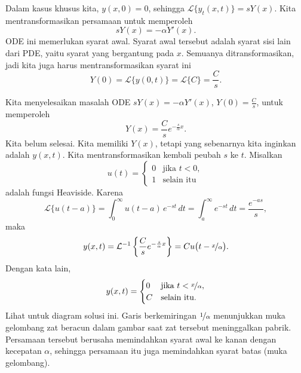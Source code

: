 \begin{example}
Dalam kasus khusus kita,
$y(x,0)=0$, sehingga
${\mathcal L} \bigl\{ y_t(x,t) \bigr\} = sY(x)$.  Kita mentransformasikan persamaan
untuk memperoleh
\begin{equation*}
sY(x) = -\alpha Y'(x) .
\end{equation*}
ODE ini memerlukan syarat awal.  Syarat awal tersebut adalah
syarat sisi lain dari PDE\@, yaitu syarat yang bergantung pada $x$.  Semuanya
ditransformasikan, jadi kita juga harus mentransformasikan syarat ini
\begin{equation*}
Y(0) = 
{\mathcal L} \bigl\{ y(0,t) \bigr\} 
=
{\mathcal L} \bigl\{ C \bigr\} 
=
\frac{C}{s} .
\end{equation*}

Kita menyelesaikan masalah ODE $sY(x) = -\alpha Y'(x)$, $Y(0) = \frac{C}{s}$, untuk memperoleh
\begin{equation*}
Y(x) = \frac{C}{s} e^{-\frac{s}{\alpha} x} .
\end{equation*}
Kita belum selesai.
Kita memiliki $Y(x)$, tetapi yang sebenarnya kita inginkan adalah $y(x,t)$.
Kita mentransformasikan kembali peubah $s$ ke $t$.
Misalkan 
\begin{equation*}
u(t) = \begin{cases} 0 & \text{jika $t < 0$}, \\ 1 & \text{selain itu}
\end{cases}
\end{equation*}
adalah fungsi Heaviside.
Karena
\begin{equation*}
{\mathcal L} \bigl\{ u(t-a) \bigr\} =
\int_0^\infty u(t-a) \, e^{-st} \,dt
=
\int_a^\infty e^{-st} \,dt
=
\frac{e^{-as}}{s} ,
\end{equation*}
maka
\begin{equation*}
y(x,t) = {\mathcal L}^{-1} \left\{
\frac{C}{s} e^{-\frac{s}{\alpha} x}
\right\}
=
C u\bigl(t-\nicefrac{x}{\alpha}\bigr) .
\end{equation*}
Dengan kata lain,
\begin{equation*}
y(x,t) =
\begin{cases}
0 & \text{jika $t < \nicefrac{x}{\alpha}$}, \\
C & \text{selain itu.}
\end{cases}
\end{equation*}
Lihat  untuk diagram
solusi ini.  Garis berkemiringan $\nicefrac{1}{\alpha}$ menunjukkan
muka gelombang zat beracun dalam gambar saat zat tersebut meninggalkan
pabrik.
Persamaan tersebut berusaha memindahkan syarat awal ke kanan
dengan kecepatan $\alpha$,
sehingga persamaan itu juga memindahkan syarat batas (muka gelombang).


\end{example}
